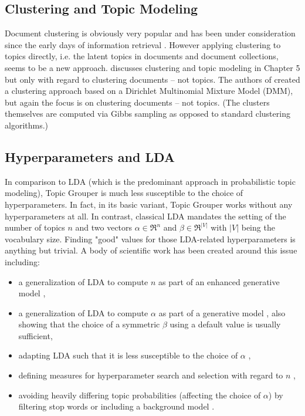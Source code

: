 \documentclass[10pt, a4paper, oneside]{article}
\begin{document}
\subsection{Clustering and Topic Modeling}

Document clustering is obviously very popular and has been under consideration since the early days of information retrieval \cite{Salton:1975:VSM:361219.361220}. However applying clustering to topics directly, i.e. the latent topics in documents and document collections, seems to be a new approach.
\cite{wallach08} discusses clustering and topic modeling in Chapter 5 but only with regard to clustering documents -- not topics.
The authors of \cite{Yin:2014:DMM:2623330.2623715} created a clustering approach based on a Dirichlet Multinomial Mixture Model (DMM), but again the focus is on clustering documents -- not topics. (The clusters themselves are computed via Gibbs sampling as opposed to standard clustering algorithms.)

\subsection{Hyperparameters and LDA}

In comparison to LDA (which is the predominant approach in probabilistic topic modeling), Topic Grouper is much less susceptible to the choice of hyperparameters. In fact, in its basic variant, Topic Grouper works without any hyperparameters at all. In contrast, classical LDA mandates the setting of the number of topics $n$ and two vectors $\alpha \in \Re^n$ and $\beta \in \Re^{|V|}$ with $|V|$ being the vocabulary size. Finding "good" values for those LDA-related hyperparameters is anything but trivial. A body of scientific work has been created around this issue including:
\begin{itemize}
\item a generalization of LDA to compute $n$ as part of an enhanced generative model \cite{Teh04hierarchicaldirichlet},
\item a generalization of LDA to compute $\alpha$ as part of a generative model \cite{conf/nips/WallachMM09}, also showing that the choice of a symmetric $\beta$ using a default value is usually sufficient,
\item adapting LDA such that it is less susceptible to the choice of $\alpha$ \cite{Tan_topic-weak-correlatedlatent},
\item defining measures for hyperparameter search and selection with regard to $n$ \cite{Arun2010},
\item avoiding heavily differing topic probabilities (affecting the choice of $\alpha$) by filtering stop words or including a background model \cite{conf/nips/ChemuduguntaSS06}.
\end{itemize}
\end{document}
